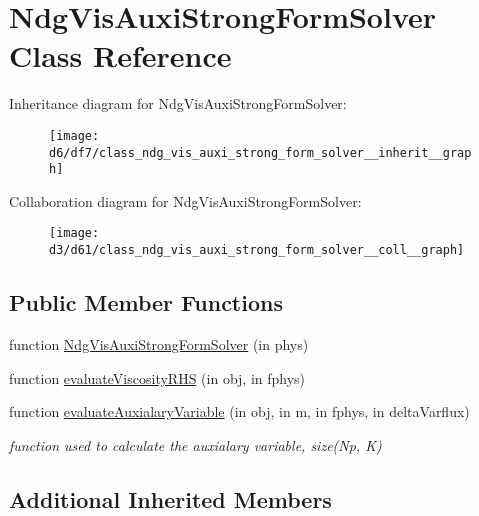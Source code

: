 \hypertarget{class_ndg_vis_auxi_strong_form_solver}{}\section{Ndg\+Vis\+Auxi\+Strong\+Form\+Solver Class Reference}
\label{class_ndg_vis_auxi_strong_form_solver}


Inheritance diagram for Ndg\+Vis\+Auxi\+Strong\+Form\+Solver\+:
\nopagebreak
\begin{figure}[H]
\begin{center}
\leavevmode
\texttt{[image: d6/df7/class\_ndg\_vis\_auxi\_strong\_form\_solver\_\_inherit\_\_graph]}
\end{center}
\end{figure}


Collaboration diagram for Ndg\+Vis\+Auxi\+Strong\+Form\+Solver\+:
\nopagebreak
\begin{figure}[H]
\begin{center}
\leavevmode
\texttt{[image: d3/d61/class\_ndg\_vis\_auxi\_strong\_form\_solver\_\_coll\_\_graph]}
\end{center}
\end{figure}
\subsection*{Public Member Functions}
\begin{DoxyCompactItemize}
\item 
function \hyperlink{class_ndg_vis_auxi_strong_form_solver_ac14c302947fc4a8c79aeff4129f4b7b5}{Ndg\+Vis\+Auxi\+Strong\+Form\+Solver} (in phys)
\item 
function \hyperlink{class_ndg_vis_auxi_strong_form_solver_a4a70d7dccaf49b7ccd8e0579ff011b0b}{evaluate\+Viscosity\+R\+HS} (in obj, in fphys)
\item 
function \hyperlink{class_ndg_vis_auxi_strong_form_solver_a640351d1165f9546bf99158a41ee97dd}{evaluate\+Auxialary\+Variable} (in obj, in m, in fphys, in delta\+Varflux)
\begin{DoxyCompactList}\small\item\em function used to calculate the auxialary variable, size(\+Np, K) \end{DoxyCompactList}\end{DoxyCompactItemize}
\subsection*{Additional Inherited Members}


